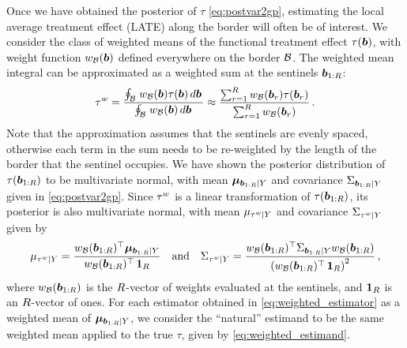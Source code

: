 \documentclass[12pt]{article}
\begin{document}
Once we have obtained the posterior of \(\tau\) \eqref{eq:postvar2gp}, estimating the local average treatment effect (LATE) along the border will often be of interest.
We consider the class of weighted means of the functional treatment effect \(\tau\del{\sentinel}\),
with weight function \(w_{\mathcal{B}}(\bm{b})\) defined everywhere on the border \(\mathcal{B}\).
The weighted mean integral can be approximated as a weighted sum at the sentinels \(\bm{b}_{1:R}\):
\begin{equation}
    \tau^{w} = \frac{\oint_{\mathcal{B}} \left. w_{\mathcal{B}}(\bm{b}) \tau(\bm{b}) \mathop{d \bm{b}} \right.}
    {\oint_{\mathcal{B}} \left. w_{\mathcal{B}}(\bm{b}) \mathop{d \bm{b}} \right.}
    \approx \frac{\sum_{r=1}^R w_{\mathcal{B}}(\bm{b}_r) \tau(\bm{b}_r)}
    {\sum_{r=1}^R w_{\mathcal{B}}(\bm{b}_r) } \,.
\label{eq:weighted_estimand}
\end{equation}
Note that the approximation assumes that the sentinels are evenly spaced, otherwise each term in the sum needs to be re-weighted by the length of the border that the sentinel occupies.
We have shown the posterior distribution of \(\tau(\bm{b}_{1:R})\) to be multivariate normal, with mean \(\bm{\mu}_{\bm{b}_{1:R} \mid Y}\) and covariance \(\Sigma_{\bm{b}_{1:R} \mid Y}\) given in \autoref{eq:postvar2gp}.
Since \(\tau^{w}\) is a linear transformation of \(\tau(\bm{b}_{1:R})\), its posterior is also multivariate normal, with mean \(\mu_{\tau^{w} \mid Y}\) and covariance \(\Sigma_{\tau^{w} \mid Y}\) given by
\begin{equation}
    \mu_{\tau^{w} \mid Y} = \frac{w_{\mathcal{B}}(\bm{b}_{1:R})^{\top} \bm{\mu}_{\bm{b}_{1:R} \mid Y}}
    {w_{\mathcal{B}}(\bm{b}_{1:R})^{\top}  \operatorname{\mathbf{1}}_R}\quad\text{and}\quad
    \Sigma_{\tau^{w} \mid Y} = \frac{w_{\mathcal{B}}(\bm{b}_{1:R})^{\top} \Sigma_{\bm{b}_{1:R} \mid Y} w_{\mathcal{B}}(\bm{b}_{1:R})}
    { \left\lparen w_{\mathcal{B}}(\bm{b}_{1:R})^{\top}  \operatorname{\mathbf{1}}_R \right\rparen^2 } \,,
\label{eq:weighted_estimator}
\end{equation}
where \(w_{\mathcal{B}}(\bm{b}_{1:R})\) is the \(R\)-vector of weights evaluated at the sentinels, and \(\operatorname{\mathbf{1}}_R\) is an \(R\)-vector of ones.
For each estimator obtained in \autoref{eq:weighted_estimator} as a weighted mean of \(\bm{\mu}_{\bm{b}_{1:R} \mid Y}\), we consider the ``natural'' estimand to be the same weighted mean applied to the true \(\tau\), given by \autoref{eq:weighted_estimand}.
\end{document}
